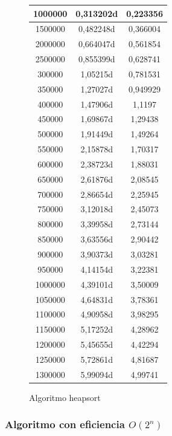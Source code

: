 \documentclass[12pt,spanish]{article}
\begin{document}
\begin{figure}[H]
\begin{tabular}{|c|c|c|}
\hline
1000000 & 0,313202d & 0,223356 \\
\hline
1500000 & 0,482248d & 0,366004\\
\hline
2000000 & 0,664047d & 0,561854\\
\hline
2500000 & 0,855399d & 0,628741\\
\hline
300000 & 1,05215d & 0,781531\\
\hline
350000 & 1,27027d & 0,949929\\
\hline
400000 & 1,47906d & 1,1197\\
\hline
450000 & 1,69867d & 1,29438\\
\hline
500000 & 1,91449d & 1,49264\\
\hline
550000 & 2,15878d & 1,70317\\
\hline
600000 & 2,38723d & 1,88031\\
\hline
650000 & 2,61876d & 2,08545\\
\hline
700000 & 2,86654d & 2,25945\\
\hline
750000 & 3,12018d & 2,45073\\
\hline
800000 & 3,39958d & 2,73144\\
\hline
850000 & 3,63556d & 2,90442\\
\hline
900000 & 3,90373d & 3,03281\\
\hline
950000 & 4,14154d & 3,22381\\
\hline
1000000 & 4,39101d & 3,50009\\
\hline
1050000 & 4,64831d & 3,78361\\
\hline
1100000 & 4,90958d & 3,98295\\
\hline
1150000 & 5,17252d & 4,28962\\
\hline
1200000 & 5,45655d & 4,42294\\
\hline
1250000 & 5,72861d & 4,81687\\
\hline
1300000 & 5,99094d & 4,99741\\
\hline
\end{tabular}
\caption{Algoritmo heapsort}
\end{figure}

\subsubsection{Algoritmo con eficiencia $O(2^n)$}
\end{document}
